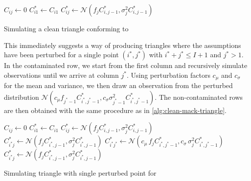 \documentclass[a4paper]{book}
\begin{document}
\begin{algorithm}[!htb]
  \begin{algorithmic}
      \State $C_{ij} \gets 0$
    \EndFor
      \State $C^*_{i1} \gets C_{i1}$
        \State $C^*_{ij} \gets \mathcal{N}(f_j C^*_{i, j - 1}, \sigma_j^2 C^*_{i, j - 1})$
      \EndFor
    \EndFor
    \State {}
  \end{algorithmic}
  \caption{Simulating a clean triangle conforming to }
  \label{alg:clean-mack-triangle}
\end{algorithm}

\restoregeometry

This immediately suggests a way of producing triangles where the assumptions have been perturbed for a single point $(i^*, j^*)$ with $i^* + j^* \leq I + 1$ and $j^* > 1$. In the contaminated row, we start from the first column and recursively simulate observations until we arrive at column $j^*$. Using perturbation factors $c_\mu$ and $c_\sigma$ for the mean and variance, we then draw an observation from the perturbed distribution $\mathcal{N}(c_\mu f_{j^* - 1} C^*_{i^*, j^* - 1}, c_\sigma \sigma^2_{j^* - 1} C^*_{i^*, j^* - 1})$. The non-contaminated rows are then obtained with the same procedure as in \cref{alg:clean-mack-triangle}.

\begin{algorithm}[!htb]
  \begin{algorithmic}
      \State $C_{ij} \gets 0$
    \EndFor
      \State $C^*_{i1} \gets C_{i1}$
          \State $C^*_{ij} \gets \mathcal{N}(f_j C^*_{i, j - 1}, \sigma_j^2 C^*_{i, j - 1})$
        \EndFor
      \Else
          \State $C^*_{i^*j} \gets \mathcal{N}(f_j C^*_{i^*, j - 1}, \sigma_j^2 C^*_{i^*, j - 1})$
        \EndFor
        \State $C^*_{i^*j^*} \gets \mathcal{N}(c_\mu \, f_j C^*_{i^*, j^* - 1}, c_\sigma \, \sigma_j^2 C^*_{i^*, j^* - 1})$
          \State $C^*_{i^*j} \gets \mathcal{N}(f_j C^*_{i^*, j - 1}, \sigma_j^2 C^*_{i^*, j - 1})$
        \EndFor
      \EndIf
    \EndFor
    \State {}
  \end{algorithmic}
  \caption{Simulating triangle with single perturbed point for }
\end{algorithm}
\end{document}
